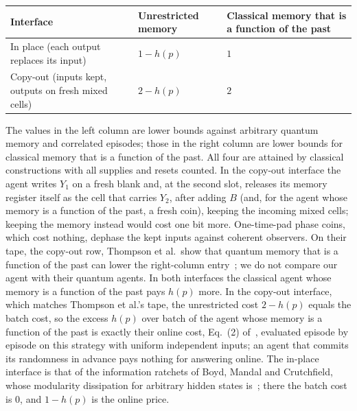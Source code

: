 \begin{center}
\begin{tabular}{>{\raggedright\arraybackslash}p{6.2cm}>{\centering\arraybackslash}p{3.3cm}>{\centering\arraybackslash}p{3.6cm}}
\toprule
Interface & Unrestricted memory & Classical memory that is a function of the past\\
\midrule
In place (each output replaces its input) & $1-h(p)$ & $1$\\
Copy-out (inputs kept, outputs on fresh mixed cells) & $2-h(p)$ & $2$\\
\bottomrule
\end{tabular}
\end{center}

The values in the left column are lower bounds against arbitrary quantum memory and correlated episodes; those in the right column are lower bounds for classical memory that is a function of the past. All four are attained by classical constructions with all supplies and resets counted. In the copy-out interface the agent writes $Y_1$ on a fresh blank and, at the second slot, releases its memory register itself as the cell that carries $Y_2$, after adding $B$ (and, for the agent whose memory is a function of the past, a fresh coin), keeping the incoming mixed cells; keeping the memory instead would cost one bit more. One-time-pad phase coins, which cost nothing, dephase the kept inputs against coherent observers. On their tape, the copy-out row, Thompson et al.\ show that quantum memory that is a function of the past can lower the right-column entry~\cite[Result~2]{Thompson25}; we do not compare our agent with their quantum agents. In both interfaces the classical agent whose memory is a function of the past pays $h(p)$ more. In the copy-out interface, which matches Thompson et al.'s tape, the unrestricted cost $2-h(p)$ equals the batch cost, so the excess $h(p)$ over batch of the agent whose memory is a function of the past is exactly their online cost, Eq.~(2) of~\cite{Thompson25}, evaluated episode by episode on this strategy with uniform independent inputs; an agent that commits its randomness in advance pays nothing for answering online. The in-place interface is that of the information ratchets of Boyd, Mandal and Crutchfield, whose modularity dissipation for arbitrary hidden states is~\cite[Eq.~(14)]{BMC18}; there the batch cost is $0$, and $1-h(p)$ is the online price.

